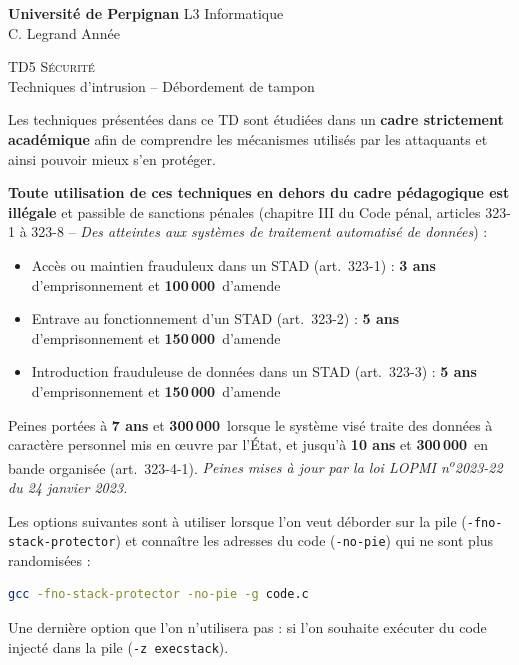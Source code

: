 \documentclass[a4paper,11pt]{article}
\theoremstyle{plain}
\theoremstyle{definition}
\begin{document}
\hbox{}
\noindent \textbf{Université de Perpignan} \hfill  L3 Informatique \\
 \hfill C. Legrand \hfill  Année \the\year \\
\smallskip
\begin{center}
{
  {\scshape \large TD5 Sécurité}  \\
 Techniques d'intrusion -- Débordement de tampon
}
\end{center}
\hbox{}

\bigskip

\begin{ethique}
Les techniques présentées dans ce TD sont étudiées dans un \textbf{cadre strictement académique} afin de comprendre les mécanismes utilisés par les attaquants et ainsi pouvoir mieux s'en protéger.

\textbf{Toute utilisation de ces techniques en dehors du cadre pédagogique est illégale} et passible de sanctions pénales (chapitre III du Code pénal, articles 323-1 à 323-8 -- \textit{Des atteintes aux systèmes de traitement automatisé de données}) :
\begin{itemize}
    \item Accès ou maintien frauduleux dans un STAD (art.~323-1) : \textbf{3 ans} d'emprisonnement et \textbf{100\,000\,\texteuro{}} d'amende
    \item Entrave au fonctionnement d'un STAD (art.~323-2) : \textbf{5 ans} d'emprisonnement et \textbf{150\,000\,\texteuro{}} d'amende
    \item Introduction frauduleuse de données dans un STAD (art.~323-3) : \textbf{5 ans} d'emprisonnement et \textbf{150\,000\,\texteuro{}} d'amende
\end{itemize}
Peines portées à \textbf{7 ans} et \textbf{300\,000\,\texteuro{}} lorsque le système visé traite des données à caractère personnel mis en \oe uvre par l'État, et jusqu'à \textbf{10 ans} et \textbf{300\,000\,\texteuro{}} en bande organisée (art.~323-4-1). \textit{Peines mises à jour par la loi LOPMI n\textsuperscript{o}2023-22 du 24 janvier 2023.}
\end{ethique}

\bigskip

\begin{tcolorbox}[colback=gray!5!white, colframe=gray!60!black, title={Options de compilation}]
Les options suivantes sont à utiliser lorsque l'on veut déborder sur la pile (\texttt{-fno-stack-protector}) et connaître les adresses du code (\texttt{-no-pie}) qui ne sont plus randomisées :
\begin{lstlisting}[language=bash,numbers=none]
gcc -fno-stack-protector -no-pie -g code.c
\end{lstlisting}
Une dernière option que l'on n'utilisera pas : si l'on souhaite exécuter du code injecté dans la pile (\texttt{-z execstack}).
\end{tcolorbox}
\end{document}
